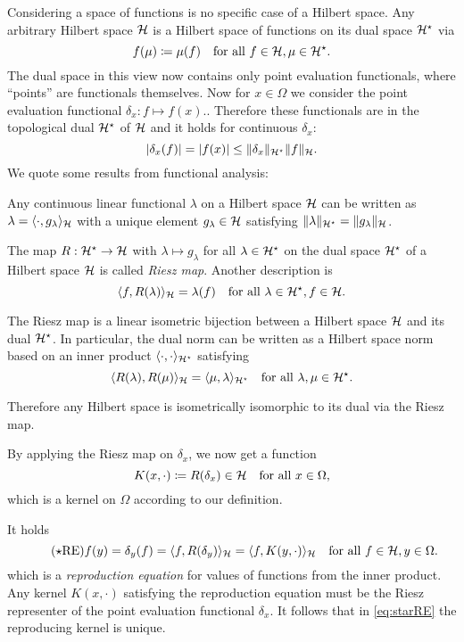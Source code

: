 \documentclass[../skript.tex]{subfiles}
\begin{document}
Considering a space of functions is no specific case of a Hilbert space. Any arbitrary Hilbert space $\mathcal{H}$ is a Hilbert space of functions on its dual space $\mathcal{H}^\star$ via
\[
	f(\mu) \coloneqq \mu(f) \quad \text{for all } f \in \mathcal{H}, \mu \in \mathcal{H}^\star.
\] 
The dual space in this view now contains only point evaluation functionals, where ``points'' are functionals themselves.
Now for $x \in \Omega$ we consider the point evaluation functional $\delta_x : f \mapsto f(x)$..
Therefore these functionals are in the topological dual $\mathcal{H}^\star$ of $\mathcal{H}$ and it holds for continuous $\delta_x$:
\[
	|\delta_x(f)| = |f(x)| \leq \| \delta_x \|_{\mathcal{H}^\star} \| f \|_{\mathcal{H}}.
\]
We quote some results from functional analysis:
\begin{theorem} %
\label{thm:3}
Any continuous linear functional $\lambda$ on a Hilbert space $\mathcal{H}$ can be written as $\lambda = \langle \cdot, g_\lambda \rangle_{\mathcal{H}}$ with a unique element $g_\lambda \in \mathcal{H}$ satisfying $\| \lambda \|_{\mathcal{H}^\star} = \| g_\lambda \|_{\mathcal{H}}$.
\end{theorem}
\begin{definition} %
\label{thm:4}
The  map $R : \mathcal{H}^\star \to \mathcal{H}$ with $\lambda \mapsto g_\lambda$ for all $\lambda \in \mathcal{H}^\star$ on the dual space $\mathcal{H}^\star$ of a Hilbert space $\mathcal{H}$ is called \emph{Riesz map}. Another description is
\[
	\langle f, R(\lambda) \rangle_{\mathcal{H}} = \lambda(f) \quad \text{for all } \lambda \in \mathcal{H}^\star, f \in \mathcal{H}.
\]
\end{definition}
\begin{theorem} %
\label{thm:5}
The Riesz map is a linear isometric bijection between a Hilbert space $\mathcal{H}$ and its dual $\mathcal{H}^\star$. In particular, the dual norm can be written as a Hilbert space norm based on an inner product $\langle \cdot, \cdot \rangle_{\mathcal{H}^\star}$ satisfying
\[
	\langle R(\lambda), R(\mu) \rangle_{\mathcal{H}} = \langle \mu, \lambda \rangle_{\mathcal{H}^\star} \quad \text{for all } \lambda, \mu \in \mathcal{H}^\star.
\]
\end{theorem}
Therefore any Hilbert space is isometrically isomorphic to its dual via the Riesz map.

By applying the Riesz map on $\delta_x$, we now get a function
\[
	K(x, \cdot) \coloneqq R(\delta_x) \in \mathcal{H} \quad \text{for all } x \in \Omega,
\]
which is a kernel on $\Omega$ according to our definition.

It holds
\begin{equation} %
\label{eq:starRE}
\tag{$\star$RE}
	f(y) = \delta_y(f) = \langle f, R(\delta_y) \rangle_{\spH} = \langle f, K(y, \cdot) \rangle_{\spH} \quad \text{for all } f \in \spH, y \in \Omega.
\end{equation}
which is a \emph{reproduction equation} for values of functions from the inner product.
Any kernel $K(x, \cdot)$ satisfying the reproduction equation must be the Riesz representer of the point evaluation functional $\delta_x$. It follows that in \cref{eq:starRE} the reproducing kernel is unique.
\end{document}
